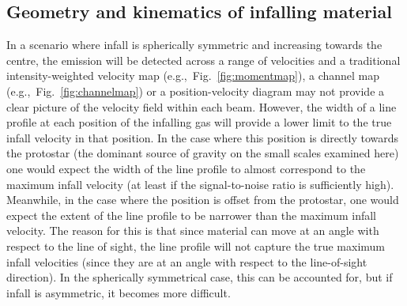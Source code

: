 \documentclass{aa}
\begin{document}
\subsection{Geometry and kinematics of infalling material}
\label{subub:infallgeometry}
In a scenario where infall is spherically symmetric and increasing towards the centre, the emission will be detected across a range of velocities and a traditional intensity-weighted velocity map (e.g.,\ Fig.~\ref{fig:momentmap}), a channel map (e.g.,\ Fig.~\ref{fig:channelmap}) or a position-velocity diagram \citep[see Fig.~8 in][]{Bjerkeli:2019ip} may not provide a clear picture of the velocity field within each beam. However, the width of a line profile at each position of the infalling gas will provide a lower limit to the true infall velocity in that position. In the case where this position is directly towards the protostar (the dominant source of gravity on the small scales examined here) one would expect the width of the line profile to almost correspond to the maximum infall velocity (at least if the signal-to-noise ratio is sufficiently high). Meanwhile, in the case where the position is offset from the protostar, one would expect the extent of the line profile to be narrower than the maximum infall velocity. The reason for this is that since material can move at an angle with respect to the line of sight, the line profile will not capture the true maximum infall velocities (since they are at an angle with respect to the line-of-sight direction). In the spherically symmetrical case, this can be accounted for, but if infall is asymmetric, it becomes more difficult. 
\end{document}
